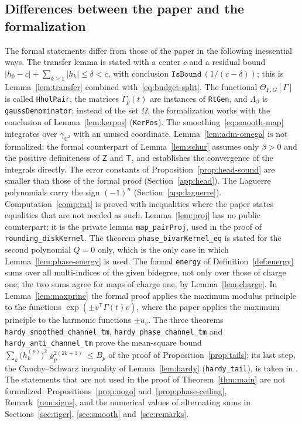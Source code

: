 \documentclass[11pt,reqno]{amsart}
\theoremstyle{definition}
\numberwithin{equation}{section}
\newcommand{\C}{\mathbb{C}}
\newcommand{\gCC}{\gamma_{\C^2}}
\newcommand{\Om}{\Omega}
\newcommand{\sZ}{\mathsf{Z}}
\newcommand{\sT}{\mathsf{T}}
\begin{document}
\subsection{Differences between the paper and the formalization}
The formal statements differ from those of the paper in the following inessential ways. The transfer lemma is stated with a center $c$ and a residual bound $|h_0-c|+\sum_{k\ge1}|h_k|\le\delta<c$, with conclusion $\texttt{IsBound}\,(1/(c-\delta))$; this is Lemma~\ref{lem:transfer} combined with~\eqref{eq:budget-split}. The functional $\Theta_{F,G}[\Gamma]$ is called \texttt{HholPair}, the matrices $\Gamma_p(t)$ are instances of \texttt{RtGen}, and $\Lambda_\beta$ is \texttt{gaussDenominator}; instead of the set $\Om$, the formalization works with the conclusion of Lemma~\ref{lem:kerpos} (\texttt{KerPos}). The smoothing~\eqref{eq:smooth-map} integrates over $\gCC$ with an unused coordinate. Lemma~\ref{lem:adm-omega} is not formalized: the formal counterpart of Lemma~\ref{lem:schur} assumes only $\beta>0$ and the positive definiteness of $\sZ$ and $\sT$, and establishes the convergence of the integrals directly. The error constants of Proposition~\ref{prop:head-sound} are smaller than those of the formal proof (Section~\ref{app:head}). The Laguerre polynomials carry the sign $(-1)^n$ (Section~\ref{app:laguerre}). Computation~\ref{comp:rat} is proved with inequalities where the paper states equalities that are not needed as such. Lemma~\ref{lem:proj} has no public counterpart: it is the private lemma \texttt{map\_pairProj}, used in the proof of \texttt{rounding\_diskKernel}. The theorem \texttt{phase\_bivarKernel\_eq} is stated for the second polynomial $Q=0$ only, which is the only case in which Lemma~\ref{lem:phase-energy} is used. The formal \texttt{energy} of Definition~\ref{def:energy} sums over all multi-indices of the given bidegree, not only over those of charge one; the two sums agree for maps of charge one, by Lemma~\ref{lem:charge}. In Lemma~\ref{lem:maxprinc} the formal proof applies the maximum modulus principle to the functions $\exp(\pm v^{\mathsf{T}}\Gamma(t)v)$, where the paper applies the maximum principle to the harmonic functions $\pm u_v$. The three theorems \texttt{hardy\_smoothed\_channel\_tm}, \texttt{hardy\_phase\_channel\_tm} and \texttt{hardy\_anti\_channel\_tm} prove the mean-square bound $\sum_{k}\bigl(h^{(p)}_k\bigr)^2\varrho_p^{2(2k+1)}\le B_p$ of the proof of Proposition~\ref{prop:tails}; its last step, the Cauchy--Schwarz inequality of Lemma~\ref{lem:hardy} (\texttt{hardy\_tail}), is taken in . The statements that are not used in the proof of Theorem~\ref{thm:main} are not formalized: Propositions~\ref{prop:nogo} and~\ref{prop:phase-ceiling}, Remark~\ref{rem:signs}, and the numerical values of alternating sums in Sections~\ref{sec:tiger}, \ref{sec:smooth} and~\ref{sec:remarks}.
\end{document}
